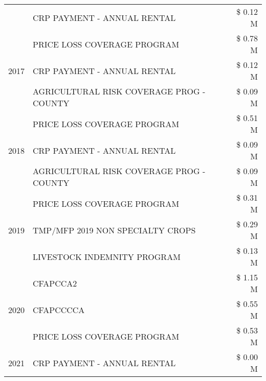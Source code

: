 \begin{tabular}{llr}
 & CRP PAYMENT - ANNUAL RENTAL                   & \$ 0.12 M \\
\cline{1-3}
\multirow[t]{3}{*}{2017} & PRICE LOSS COVERAGE PROGRAM & \$ 0.78 M \\
 & CRP PAYMENT - ANNUAL RENTAL & \$ 0.12 M \\
 & AGRICULTURAL RISK COVERAGE PROG - COUNTY & \$ 0.09 M \\
\cline{1-3}
\multirow[t]{3}{*}{2018} & PRICE LOSS COVERAGE PROGRAM & \$ 0.51 M \\
 & CRP PAYMENT - ANNUAL RENTAL & \$ 0.09 M \\
 & AGRICULTURAL RISK COVERAGE PROG - COUNTY & \$ 0.09 M \\
\cline{1-3}
\multirow[t]{3}{*}{2019} & PRICE LOSS COVERAGE PROGRAM & \$ 0.31 M \\
 & TMP/MFP 2019 NON SPECIALTY CROPS & \$ 0.29 M \\
 & LIVESTOCK INDEMNITY PROGRAM & \$ 0.13 M \\
\cline{1-3}
\multirow[t]{3}{*}{2020} & CFAPCCA2 & \$ 1.15 M \\
 & CFAPCCCCA & \$ 0.55 M \\
 & PRICE LOSS COVERAGE PROGRAM & \$ 0.53 M \\
\cline{1-3}
2021 & CRP PAYMENT - ANNUAL RENTAL & \$ 0.00 M \\
\cline{1-3}
\bottomrule
\end{tabular}
